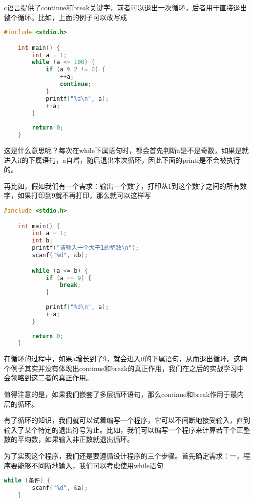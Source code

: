 c语言提供了continue和break关键字，前者可以退出一次循环，后者用于直接退出整个循环。比如，上面的例子可以改写成

\begin{lstlisting}[language=C]
    #include <stdio.h>

    int main() {
        int a = 1;
        while (a <= 100) {
            if (a % 2 != 0) {
                ++a;
                continue;
            }
            printf("%d\n", a);
            ++a;
        }
        
        return 0;
    }
\end{lstlisting}

这是什么意思呢？每次在while下属语句时，都会首先判断a是不是奇数，如果是就进入if的下属语句，a自增，随后退出本次循环，因此下面的printf是不会被执行的。

再比如，假如我们有一个需求：输出一个数字，打印从1到这个数字之间的所有数字，如果打印到9就不再打印，那么就可以这样写

\begin{lstlisting}[language=C]
    #include <stdio.h>

    int main() {
        int a = 1;
        int b;
        printf("请输入一个大于1的整数\n");
        scanf("%d", &b);

        while (a <= b) {
            if (a == 9) {
                break;
            }
            
            printf("%d\n", a);
            ++a;
        }
        
        return 0;
    }
\end{lstlisting}

在循环的过程中，如果a增长到了9，就会进入if的下属语句，从而退出循环。这两个例子其实并没有体现出continue和break的真正作用，我们在之后的实战学习中会领略到这二者的真正作用。

值得注意的是，如果我们嵌套了多层循环语句，那么continue和break作用于最内层的循环。

有了循环的知识，我们就可以试着编写一个程序，它可以不间断地接受输入，直到输入了某个特定的退出符号为止。比如，我们可以编写一个程序来计算若干个正整数的平均数，如果输入非正数就退出循环。

为了实现这个程序，我们还是要遵循设计程序的三个步骤。首先确定需求：一，程序要能够不间断地输入，我们可以考虑使用while语句

\begin{lstlisting}[language=C]
    while (条件) {
        scanf("%d", &a);
    }
\end{lstlisting}

